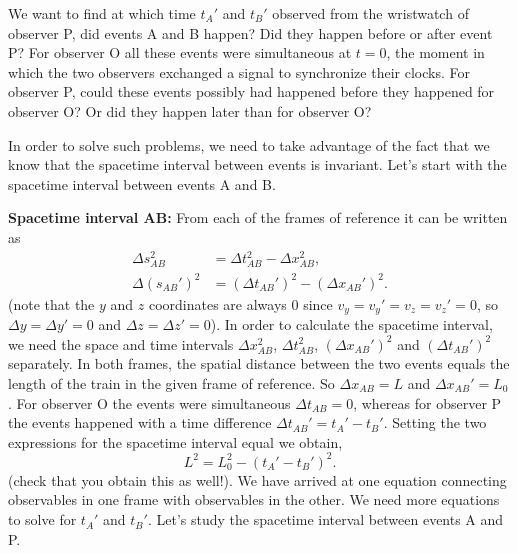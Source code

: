 {\begin{multicols}{2}
We want to find at which time $t_A'$ and $t_B'$ observed from the wristwatch of observer P, did events A and B happen? Did they happen before or after event P? For observer O all these events were simultaneous at $t=0$, the moment in which the two observers exchanged a signal to synchronize their clocks.  For observer P, could these events possibly had happened before they happened for observer O? Or did they happen later than for observer O?

In order to solve such problems, we need to take advantage of the fact that we know that the spacetime interval between events is invariant. Let's start with the spacetime interval between events A and B.

{\bf Spacetime interval AB:}
From each of the frames of reference it can be written as
\begin{align*}
\Delta s_{AB}^2&=\Delta t_{AB}^2-\Delta x_{AB}^2,\\
\Delta (s_{AB}')^2&=(\Delta t_{AB}')^2-(\Delta x_{AB}')^2.
\end{align*}
(note that the $y$ and $z$ coordinates are always 0 since $v_y=v_y'=v_z=v_z'=0$, so $\Delta y=\Delta y'=0$ and $\Delta z=\Delta z'=0$). In order to calculate the spacetime interval, we need the space and time intervals $\Delta x_{AB}^2$, $\Delta t_{AB}^2$, $(\Delta x_{AB}')^2$ and $(\Delta t_{AB}')^2$ separately. In both frames, the spatial distance between the two events equals the length of the train in the given frame of reference. So $\Delta x_{AB}=L$ and $\Delta x_{AB}'=L_0$. For observer O the events were simultaneous $\Delta t_{AB}=0$, whereas for observer P the events happened with a time difference $\Delta t_{AB}'=t_A'-t_B'$. Setting the two expressions for the spacetime interval equal we obtain,
\begin{equation}
\label{eq:eq1}
L^2=L_0^2-(t_A'-t_B')^2.
\end{equation}
(check that you obtain this as well!). We have arrived at one equation connecting observables in one frame with observables in the other. We need more equations to solve for $t_A'$ and $t_B'$. Let's study the spacetime interval between events A and P.


\end{multicols}}

